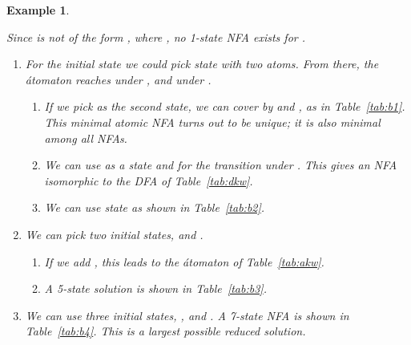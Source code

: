 \documentclass[preprint,12pt]{elsarticle}
\newcommand{\be}{\begin{enumerate}}
\newcommand{\ee}{\end{enumerate}}
\newcommand{\qedb}{\hfill}
\newtheorem{example}{Example}
\begin{document}
\begin{example}
\begin{table}[hbt]
\begin{minipage}[b]{0.45\linewidth}
{\begin{center}
\end{center}}
\end{minipage}
\hspace{0.4cm}
\begin{minipage}[b]{0.45\linewidth}
\caption{NFA .}
\label{tab:b2}
{\footnotesize
\begin{center}

\end{center}}
\end{minipage}
\end{table}




\begin{table}[t]
\begin{minipage}[b]{0.45\linewidth}
\caption{A 5-state NFA.}
\label{tab:b3}
{\footnotesize
\begin{center}

\end{center}}
\end{minipage}
\hspace{.4cm}
\begin{minipage}[b]{0.45\linewidth}
\caption{A 7-state NFA.}
\label{tab:b4}
{\footnotesize
\begin{center}

\end{center}}
\end{minipage}
\end{table}

Since  is not of the form , where , 
no 1-state NFA exists for .
\be
\item 
For the initial state we could pick state  with two atoms.  From there, the \'atomaton reaches 
 under , and   under . 
        \be
        \item
If we pick 
as the second state,  we can cover  by  and 
, as  in Table~\ref{tab:b1}. This minimal
atomic NFA turns out to be unique; it is also minimal among all NFAs.
        \item
        We can use  as a state and 
        for the transition under . This gives an NFA  isomorphic to the DFA of Table~\ref{tab:dkw}.
        \item
        We can use state 
        as shown in Table~\ref{tab:b2}.
        \ee
\item
We can pick two initial states,  and . 
        \be
        \item
        If we add , this leads to the  \'atomaton of Table~\ref{tab:akw}.
        \item
        A 5-state solution is shown in Table~\ref{tab:b3}.
        \ee
\item
We can use three initial states, ,  and . 
        A 7-state NFA is shown in  Table~\ref{tab:b4}. This 
           is a largest possible reduced solution.\qedb
\ee

\end{example}
\end{document}
